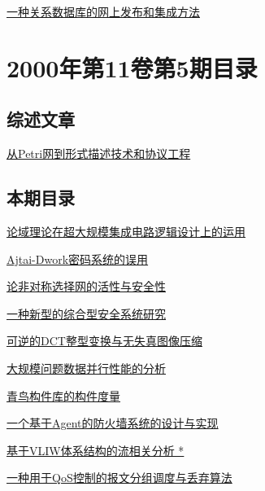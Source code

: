 \documentclass[a4paper]{article}
\begin{document}
\href{http://www.jos.org.cn/ch/reader/download_pdf.aspx?file_no=20000621&year_id=2000&quarter_id=6&falg=1}{一种关系数据库的网上发布和集成方法}


\section{\textbf{2000年第11卷第5期目录}}
\subsection{综述文章}
\href{http://www.jos.org.cn/ch/reader/download_pdf.aspx?file_no=20000504&year_id=2000&quarter_id=5&falg=1}{从Petri网到形式描述技术和协议工程}

\subsection{本期目录}
\href{http://www.jos.org.cn/ch/reader/download_pdf.aspx?file_no=20000501&year_id=2000&quarter_id=5&falg=1}{论域理论在超大规模集成电路逻辑设计上的运用}

\href{http://www.jos.org.cn/ch/reader/download_pdf.aspx?file_no=20000502&year_id=2000&quarter_id=5&falg=1}{Ajtai-Dwork密码系统的误用}

\href{http://www.jos.org.cn/ch/reader/download_pdf.aspx?file_no=20000503&year_id=2000&quarter_id=5&falg=1}{论非对称选择网的活性与安全性}

\href{http://www.jos.org.cn/ch/reader/download_pdf.aspx?file_no=20000505&year_id=2000&quarter_id=5&falg=1}{一种新型的综合型安全系统研究}

\href{http://www.jos.org.cn/ch/reader/download_pdf.aspx?file_no=20000506&year_id=2000&quarter_id=5&falg=1}{可逆的DCT整型变换与无失真图像压缩}

\href{http://www.jos.org.cn/ch/reader/download_pdf.aspx?file_no=20000507&year_id=2000&quarter_id=5&falg=1}{大规模问题数据并行性能的分析}

\href{http://www.jos.org.cn/ch/reader/download_pdf.aspx?file_no=20000508&year_id=2000&quarter_id=5&falg=1}{青鸟构件库的构件度量}

\href{http://www.jos.org.cn/ch/reader/download_pdf.aspx?file_no=20000509&year_id=2000&quarter_id=5&falg=1}{一个基于Agent的防火墙系统的设计与实现}

\href{http://www.jos.org.cn/ch/reader/download_pdf.aspx?file_no=20000510&year_id=2000&quarter_id=5&falg=1}{基于VLIW体系结构的流相关分析 *}

\href{http://www.jos.org.cn/ch/reader/download_pdf.aspx?file_no=20000511&year_id=2000&quarter_id=5&falg=1}{一种用于QoS控制的报文分组调度与丢弃算法}
\end{document}
